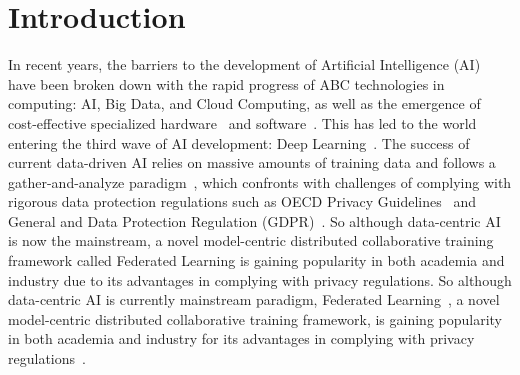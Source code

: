 \section{Introduction}


In recent years, the barriers to the development of Artificial Intelligence (AI) have been broken down with the rapid progress of ABC technologies in computing: AI, Big Data, and Cloud Computing, as well as the emergence of cost-effective specialized hardware~\cite{sze2017efficient} and software~\cite{jia2014caffe}. This has led to the world entering the third wave of AI development: Deep Learning~\cite{lecun2015deep}.
The success of current data-driven AI relies on massive amounts of training data and follows a gather-and-analyze paradigm~\cite{whang2023data}, which confronts with challenges of complying with rigorous data protection regulations such as OECD Privacy Guidelines~\cite{tene2011privacy} and General and Data Protection Regulation (GDPR)~\cite{voigt2017eu}.
So although data-centric AI is now the mainstream, a novel model-centric distributed collaborative training framework called Federated Learning is gaining popularity in both academia and industry due to its advantages in complying with privacy regulations.
So although data-centric AI is currently mainstream paradigm, Federated Learning~\cite{li2020federated}, a novel model-centric distributed collaborative training framework, is gaining popularity in both academia and industry for its advantages in complying with privacy regulations~\cite{truong2021privacy}.

